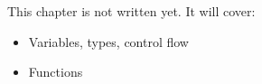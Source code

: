 \label{ch:py1}
\begin{keyidea}
This chapter is not written yet. It will cover:
\begin{itemize}[nosep]
  \item Variables, types, control flow
  \item Functions
\end{itemize}
\end{keyidea}
